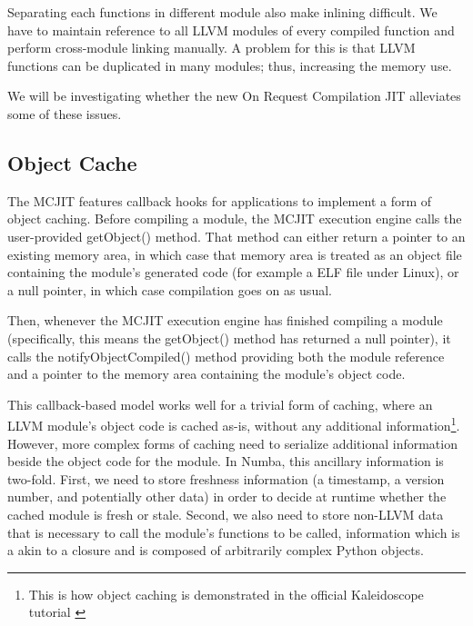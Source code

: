 \documentclass{acm_proc_article-sp}
\begin{document}
Separating each functions in different module also make inlining difficult.
We have to maintain reference to all LLVM modules of every compiled function
and perform cross-module linking manually. A problem for this is that
LLVM functions can be duplicated in many modules; thus, increasing the memory
use.

We will be investigating whether the new On Request Compilation JIT
alleviates some of these issues.


\subsection{Object Cache}

The MCJIT features callback hooks for
applications to implement a form of object caching.
Before compiling a module, the MCJIT execution engine
calls the user-provided getObject() method.  That method can either
return a pointer to an existing memory area, in which case that
memory area is treated as an object file containing the module's
generated code (for example a ELF file under Linux), or a null pointer,
in which case compilation goes on as usual.

Then, whenever the MCJIT execution engine has finished compiling a
module (specifically, this means the getObject() method has returned
a null pointer), it calls the notifyObjectCompiled() method providing
both the module reference and a pointer to the memory area containing
the module's object code.

This callback-based model works well for a trivial form of caching,
where an LLVM module's object code is cached as-is, without any
additional information\footnote{This is how object caching is demonstrated in
the official Kaleidoscope tutorial \cite{llvmblog:kaleidoscope}}.
However, more complex forms of
caching need to serialize additional information beside the object code
for the module.  In Numba, this ancillary information is two-fold.  First,
we need to store freshness information (a timestamp, a version number,
and potentially other data) in order to decide at runtime whether the
cached module is fresh or stale.  Second, we also need to store non-LLVM
data that is necessary to call the module's functions to be called,
information which is a akin to a closure and is composed of arbitrarily
complex Python objects.
\end{document}
